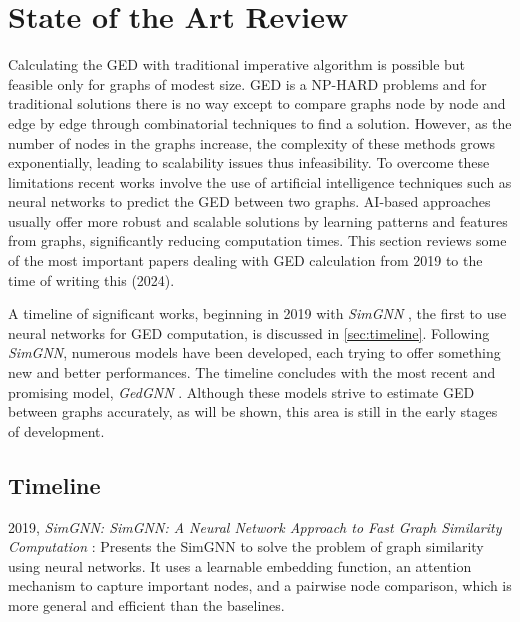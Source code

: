 \documentclass[../Thesis.tex]{subfiles}
\begin{document}
	
	\section{State of the Art Review}
	\label{sec:state_of_the_art_review}
	
	Calculating the GED with traditional imperative algorithm is possible but feasible only for graphs of modest size. GED is a NP-HARD problems and for traditional solutions there is no way except to compare graphs node by node and edge by edge through combinatorial techniques to find a solution. However, as the number of nodes in the graphs increase, the complexity of these methods grows exponentially, leading to scalability issues thus infeasibility. To overcome these limitations recent works involve the use of artificial intelligence techniques such as neural networks to predict the GED between two graphs. AI-based approaches usually offer more robust and scalable solutions by learning patterns and features from graphs, significantly reducing computation times. This section reviews some of the most important papers dealing with GED calculation from 2019 to the time of writing this (2024).

	A timeline of significant works, beginning in 2019 with \textit{SimGNN} \cite{simgnn__a_neural_network_approach_to_fast_graph_similarity_computation}, the first to use neural networks for GED computation, is discussed in \autoref{sec:timeline}. Following \textit{SimGNN}, numerous models have been developed, each trying to offer something new and better performances. The timeline concludes with the most recent and promising model, \textit{GedGNN} \cite{computing_graph_edit_distance_via_neural_graph_matching}. Although these models strive to estimate GED between graphs accurately, as will be shown, this area is still in the early stages of development.
	
	
	\subsection{Timeline}
	\label{sec:timeline}
	
	2019, \textit{SimGNN: SimGNN: A Neural Network Approach to Fast Graph Similarity Computation} \cite{simgnn__a_neural_network_approach_to_fast_graph_similarity_computation}: Presents the SimGNN to solve the problem of graph similarity using neural networks. It uses a learnable embedding function, an attention mechanism to capture important nodes, and a pairwise node comparison, which is more general and efficient than the baselines.
	
\end{document}
